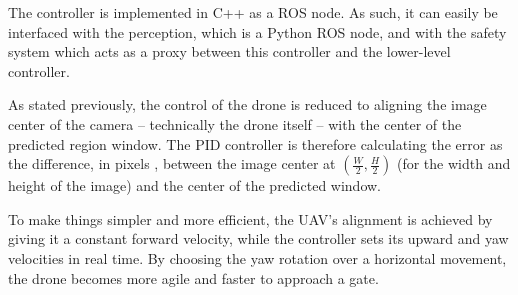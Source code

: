 The controller is implemented in C++ as a ROS node. As such, it can easily be
interfaced with the perception, which is a Python ROS node, and with the safety
system which acts as a proxy between this controller and the lower-level
controller.

As stated previously, the control of the drone is reduced to aligning the image
center of the camera -- technically the drone itself -- with the center of the
predicted region window. The PID controller is therefore calculating the error
as the difference, in pixels , between the image center at $(\frac{W}{2},
\frac{H}{2})$ (for the width and height of the image) and the center of the
predicted window.

To make things simpler and more efficient, the UAV's alignment is achieved by
giving it a constant forward velocity, while the controller sets its upward and
yaw velocities in real time. By choosing the yaw rotation over a horizontal
movement, the drone becomes more agile and faster to approach a gate.

